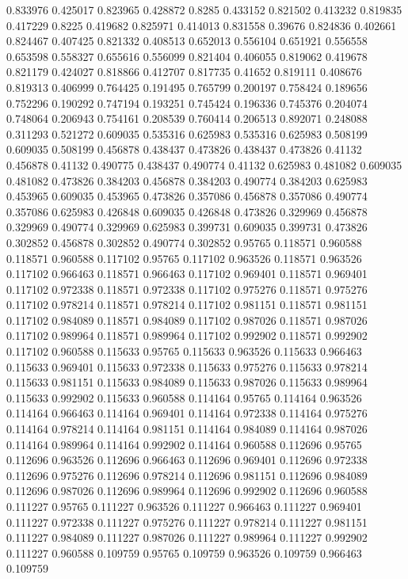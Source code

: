 0.833976 0.425017
0.823965 0.428872
0.8285 0.433152
0.821502 0.413232
0.819835 0.417229
0.8225 0.419682
0.825971 0.414013
0.831558 0.39676
0.824836 0.402661
0.824467 0.407425
0.821332 0.408513
0.652013 0.556104
0.651921 0.556558
0.653598 0.558327
0.655616 0.556099
0.821404 0.406055
0.819062 0.419678
0.821179 0.424027
0.818866 0.412707
0.817735 0.41652
0.819111 0.408676
0.819313 0.406999
0.764425 0.191495
0.765799 0.200197
0.758424 0.189656
0.752296 0.190292
0.747194 0.193251
0.745424 0.196336
0.745376 0.204074
0.748064 0.206943
0.754161 0.208539
0.760414 0.206513
0.892071 0.248088
0.311293 0.521272
0.609035 0.535316
0.625983 0.535316
0.625983 0.508199
0.609035 0.508199
0.456878 0.438437
0.473826 0.438437
0.473826 0.41132
0.456878 0.41132
0.490775 0.438437
0.490774 0.41132
0.625983 0.481082
0.609035 0.481082
0.473826 0.384203
0.456878 0.384203
0.490774 0.384203
0.625983 0.453965
0.609035 0.453965
0.473826 0.357086
0.456878 0.357086
0.490774 0.357086
0.625983 0.426848
0.609035 0.426848
0.473826 0.329969
0.456878 0.329969
0.490774 0.329969
0.625983 0.399731
0.609035 0.399731
0.473826 0.302852
0.456878 0.302852
0.490774 0.302852
0.95765 0.118571
0.960588 0.118571
0.960588 0.117102
0.95765 0.117102
0.963526 0.118571
0.963526 0.117102
0.966463 0.118571
0.966463 0.117102
0.969401 0.118571
0.969401 0.117102
0.972338 0.118571
0.972338 0.117102
0.975276 0.118571
0.975276 0.117102
0.978214 0.118571
0.978214 0.117102
0.981151 0.118571
0.981151 0.117102
0.984089 0.118571
0.984089 0.117102
0.987026 0.118571
0.987026 0.117102
0.989964 0.118571
0.989964 0.117102
0.992902 0.118571
0.992902 0.117102
0.960588 0.115633
0.95765 0.115633
0.963526 0.115633
0.966463 0.115633
0.969401 0.115633
0.972338 0.115633
0.975276 0.115633
0.978214 0.115633
0.981151 0.115633
0.984089 0.115633
0.987026 0.115633
0.989964 0.115633
0.992902 0.115633
0.960588 0.114164
0.95765 0.114164
0.963526 0.114164
0.966463 0.114164
0.969401 0.114164
0.972338 0.114164
0.975276 0.114164
0.978214 0.114164
0.981151 0.114164
0.984089 0.114164
0.987026 0.114164
0.989964 0.114164
0.992902 0.114164
0.960588 0.112696
0.95765 0.112696
0.963526 0.112696
0.966463 0.112696
0.969401 0.112696
0.972338 0.112696
0.975276 0.112696
0.978214 0.112696
0.981151 0.112696
0.984089 0.112696
0.987026 0.112696
0.989964 0.112696
0.992902 0.112696
0.960588 0.111227
0.95765 0.111227
0.963526 0.111227
0.966463 0.111227
0.969401 0.111227
0.972338 0.111227
0.975276 0.111227
0.978214 0.111227
0.981151 0.111227
0.984089 0.111227
0.987026 0.111227
0.989964 0.111227
0.992902 0.111227
0.960588 0.109759
0.95765 0.109759
0.963526 0.109759
0.966463 0.109759
